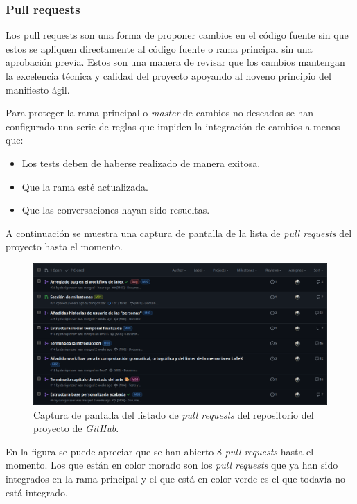 \subsubsection{Pull requests}

Los pull requests son una forma de proponer cambios en el código fuente sin que estos se apliquen directamente al código fuente o rama principal sin una aprobación previa. Estos son una manera de revisar que los cambios mantengan la excelencia técnica y calidad del proyecto apoyando al noveno principio del manifiesto ágil.

Para proteger la rama principal o \textit{master} de cambios no deseados se han configurado una serie de reglas que impiden la integración de cambios a menos que:

\begin{itemize}
    \item Los tests deben de haberse realizado de manera exitosa.
    \item Que la rama esté actualizada.
    \item Que las conversaciones hayan sido resueltas.
\end{itemize}

A continuación se muestra una captura de pantalla de la lista de \textit{pull requests} del proyecto hasta el momento.

\begin{figure}[H]
    \caption{Captura de pantalla del listado de \textit{pull requests} del repositorio del proyecto de \textit{GitHub}.}
    \centering
    \vspace*{0.5cm}
    \includegraphics[scale=0.2]{figuras/listado_pull_requests_github.png}
\end{figure}

En la figura se puede apreciar que se han abierto 8 \textit{pull requests} hasta el momento. Los que están en color morado son los \textit{pull requests} que ya han sido integrados en la rama principal y el que está en color verde es el que todavía no está integrado.

